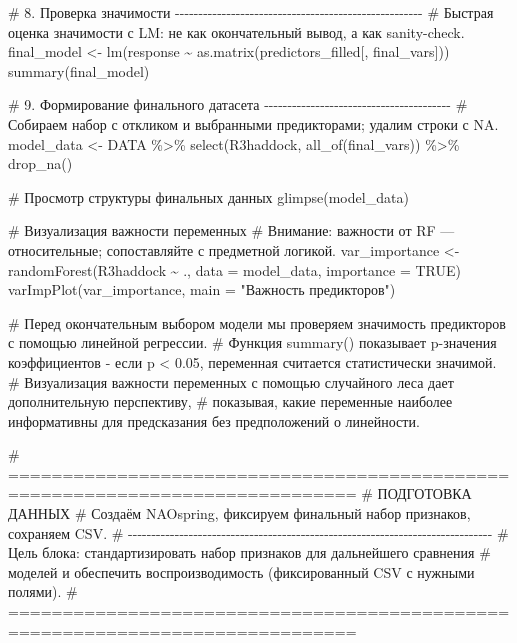 \documentclass[
  letterpaper,
  DIV=11,
  numbers=noendperiod]{scrreprt}
\newenvironment{Shaded}{\begin{snugshade}}{\end{snugshade}}
\newcommand{\AttributeTok}[1]{\textcolor[rgb]{0.40,0.45,0.13}{#1}}
\newcommand{\CommentTok}[1]{\textcolor[rgb]{0.37,0.37,0.37}{#1}}
\newcommand{\ConstantTok}[1]{\textcolor[rgb]{0.56,0.35,0.01}{#1}}
\newcommand{\FunctionTok}[1]{\textcolor[rgb]{0.28,0.35,0.67}{#1}}
\newcommand{\NormalTok}[1]{\textcolor[rgb]{0.00,0.23,0.31}{#1}}
\newcommand{\OtherTok}[1]{\textcolor[rgb]{0.00,0.23,0.31}{#1}}
\newcommand{\SpecialCharTok}[1]{\textcolor[rgb]{0.37,0.37,0.37}{#1}}
\newcommand{\StringTok}[1]{\textcolor[rgb]{0.13,0.47,0.30}{#1}}
\begin{document}
\begin{Shaded}
\begin{Highlighting}[]
\CommentTok{\# 8. Проверка значимости {-}{-}{-}{-}{-}{-}{-}{-}{-}{-}{-}{-}{-}{-}{-}{-}{-}{-}{-}{-}{-}{-}{-}{-}{-}{-}{-}{-}{-}{-}{-}{-}{-}{-}{-}{-}{-}{-}{-}{-}{-}{-}{-}{-}{-}{-}{-}{-}{-}{-}{-}{-}{-}}
\CommentTok{\# Быстрая оценка значимости с LM: не как окончательный вывод, а как sanity{-}check.}
\NormalTok{final\_model }\OtherTok{\textless{}{-}} \FunctionTok{lm}\NormalTok{(response }\SpecialCharTok{\textasciitilde{}} \FunctionTok{as.matrix}\NormalTok{(predictors\_filled[, final\_vars]))}
\FunctionTok{summary}\NormalTok{(final\_model)}

\CommentTok{\# 9. Формирование финального датасета {-}{-}{-}{-}{-}{-}{-}{-}{-}{-}{-}{-}{-}{-}{-}{-}{-}{-}{-}{-}{-}{-}{-}{-}{-}{-}{-}{-}{-}{-}{-}{-}{-}{-}{-}{-}{-}{-}{-}{-}}
\CommentTok{\# Собираем набор с откликом и выбранными предикторами; удалим строки с NA.}
\NormalTok{model\_data }\OtherTok{\textless{}{-}}\NormalTok{ DATA }\SpecialCharTok{\%\textgreater{}\%}
  \FunctionTok{select}\NormalTok{(R3haddock, }\FunctionTok{all\_of}\NormalTok{(final\_vars)) }\SpecialCharTok{\%\textgreater{}\%}
  \FunctionTok{drop\_na}\NormalTok{()}

\CommentTok{\# Просмотр структуры финальных данных}
\FunctionTok{glimpse}\NormalTok{(model\_data)}

\CommentTok{\# Визуализация важности переменных}
\CommentTok{\# Внимание: важности от RF — относительные; сопоставляйте с предметной логикой.}
\NormalTok{var\_importance }\OtherTok{\textless{}{-}} \FunctionTok{randomForest}\NormalTok{(R3haddock }\SpecialCharTok{\textasciitilde{}}\NormalTok{ ., }\AttributeTok{data =}\NormalTok{ model\_data, }\AttributeTok{importance =} \ConstantTok{TRUE}\NormalTok{)}
\FunctionTok{varImpPlot}\NormalTok{(var\_importance, }\AttributeTok{main =} \StringTok{"Важность предикторов"}\NormalTok{)}

\CommentTok{\# Перед окончательным выбором модели мы проверяем значимость предикторов с помощью линейной регрессии.}
\CommentTok{\# Функция summary() показывает p{-}значения коэффициентов {-} если p \textless{} 0.05, переменная считается статистически значимой. }
\CommentTok{\# Визуализация важности переменных с помощью случайного леса дает дополнительную перспективу,}
\CommentTok{\# показывая, какие переменные наиболее информативны для предсказания без предположений о линейности.}

\CommentTok{\# ==============================================================================}
\CommentTok{\#  ПОДГОТОВКА ДАННЫХ}
\CommentTok{\# Создаём NAOspring, фиксируем финальный набор признаков, сохраняем CSV.}
\CommentTok{\# {-}{-}{-}{-}{-}{-}{-}{-}{-}{-}{-}{-}{-}{-}{-}{-}{-}{-}{-}{-}{-}{-}{-}{-}{-}{-}{-}{-}{-}{-}{-}{-}{-}{-}{-}{-}{-}{-}{-}{-}{-}{-}{-}{-}{-}{-}{-}{-}{-}{-}{-}{-}{-}{-}{-}{-}{-}{-}{-}{-}{-}{-}{-}{-}{-}{-}{-}{-}{-}{-}{-}{-}{-}{-}{-}{-}{-}{-}}
\CommentTok{\# Цель блока: стандартизировать набор признаков для дальнейшего сравнения}
\CommentTok{\# моделей и обеспечить воспроизводимость (фиксированный CSV с нужными полями).}
\CommentTok{\# ==============================================================================}


\end{Highlighting}
\end{Shaded}
\end{document}
